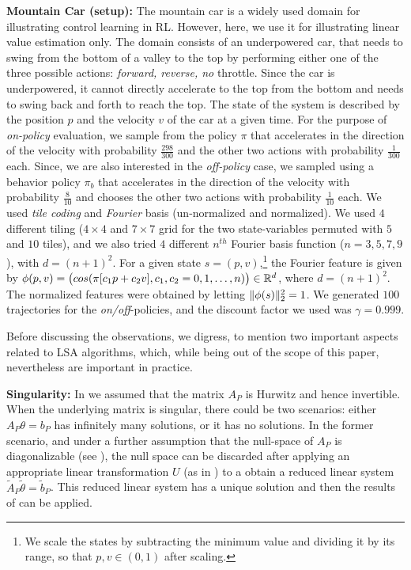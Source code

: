 \textbf{Mountain Car (setup):}  The mountain car is a widely used domain for illustrating control learning in RL.
However, here, we use it for illustrating linear value estimation only. The domain consists of an underpowered car, that needs to swing from the bottom of a valley to the top by performing either one of the three possible actions: \emph{forward, reverse, no} throttle. Since the car is underpowered, it cannot directly accelerate to the top from the bottom and needs to swing back and forth to reach the top. The state of the system is described by the position $p$ and the velocity $v$ of the car at a given time. For the purpose of \emph{on-policy} evaluation, we sample from the policy $\pi$ that accelerates in the direction of the velocity with probability $\frac{298}{300}$ and the other two actions with probability $\frac{1}{300}$ each. Since, we are also interested in the \emph{off-policy} case, we sampled using a behavior policy $\pi_b$ that accelerates in the direction of the velocity with probability $\frac{8}{10}$ and chooses the other two actions with probability $\frac{1}{10}$ each. We used \emph{tile coding} and \emph{Fourier} basis (un-normalized and normalized). We used $4$ different tiling ($4\times 4$ and $7\times 7$ grid for the two state-variables permuted with $5$ and $10$ tiles), and we also tried $4$ different $n^{th}$ Fourier basis function ($n=3,5,7,9$), with $d=(n+1)^2$. For a given state $s=(p,v)$,\footnote{We scale the states by subtracting the minimum value and dividing it by its range, so that $p,v\in(0,1)$ after scaling.} the Fourier feature is given by $\phi(p,v)=\big(cos(\pi [c_1p+c_2 v],c_1,c_2=0,1,\ldots,n)\big) \in \mathbb{R}^{d}$, where $d=(n+1)^2$. The normalized features were obtained by letting $\| \phi(s)\|^2_2=1$. We generated $100$ trajectories for the \emph{on/off}-policies, and the discount factor we used was $\gamma=0.999$. 

Before discussing the observations, we digress, to mention two important aspects related to LSA algorithms, which, while being out of the scope of this paper, nevertheless are important in practice.

\textbf{Singularity:} In  we assumed that the matrix $A_P$ is Hurwitz and hence invertible. When the underlying matrix is singular, there could be two scenarios: either $A_P\theta=b_P$ has infinitely many solutions, or it has no solutions. In the former scenario, and under a further assumption that the null-space of $A_P$ is diagonalizable (see \cite{bertstab}), the null space can be discarded after applying an appropriate linear transformation $U$ (as in ) to a obtain a reduced linear system $\tilde{A}_P\tilde{\theta}=\tilde{b}_P$. This reduced linear system has a unique solution and then the results of  can be applied.

